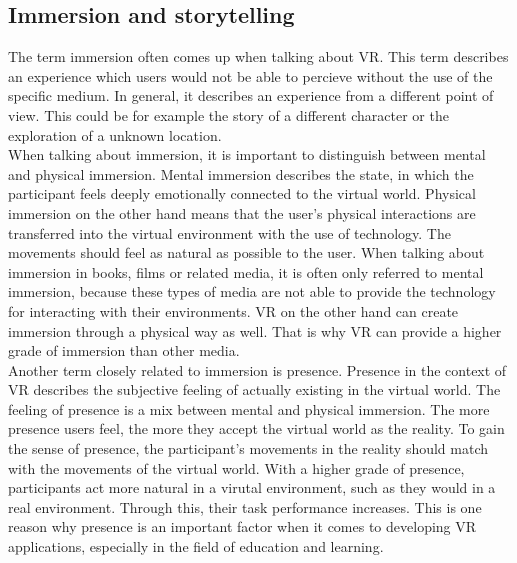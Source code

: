 \subsection{Immersion and storytelling}
The term immersion often comes up when talking about VR. This term describes an experience which users would not be able to percieve without the use of the specific medium. In general, it describes an experience from a different point of view. This could be for example the story of a different character or the exploration of a unknown location. \cite{Tham.2018} \\
When talking about immersion, it is important to distinguish between  mental and physical immersion. Mental immersion describes the state, in which the participant feels deeply emotionally connected to the virtual world. Physical immersion on the other hand means that the user's physical interactions are transferred into the virtual environment with the use of technology. The movements should feel as natural as possible to the user. When talking about immersion in books, films or related media, it is often only referred to mental immersion, because these types of media are not able to provide the technology for interacting with their environments. VR on the other hand can create immersion through a physical way as well. That is why VR can provide a higher grade of immersion than other media. \cite{Tham.2018}\\
Another term closely related to immersion is presence. Presence in the context of VR describes the subjective feeling of actually existing in the virtual world. The feeling of presence is a mix between mental and physical immersion. The more presence users feel, the more they accept the virtual world as the reality. To gain the sense of presence, the participant's movements in the reality should match with the movements of the virtual world. With a higher grade of presence, participants act more natural in a virutal environment, such as they would in a real environment. Through this, their task performance increases. This is one reason why presence is an important factor when it comes to developing VR applications, especially in the field of education and learning. \cite{Slater.1997}

